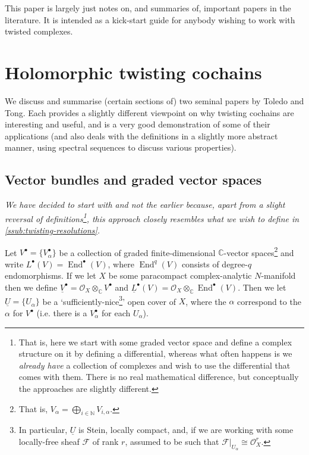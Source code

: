 \documentclass[11pt,notitlepage]{article}
\numberwithin{equation}{subsection}
\DeclareMathOperator{\End}{End}
\begin{document}
                This paper is largely just notes on, and summaries of, important papers in the literature.
                It is intended as a kick-start guide for anybody wishing to work with twisted complexes.

        \section{Holomorphic twisting cochains}\label{sec:holomorphic-twisting-cochains}

            We discuss and summarise (certain sections of) two seminal papers by Toledo and Tong.
            Each provides a slightly different viewpoint on why twisting cochains are interesting and useful, and \cite{OBrian:1981vs} is a very good demonstration of some of their applications (and also deals with the definitions in a slightly more abstract manner, using spectral sequences to discuss various properties).

            \subsection{Vector bundles and graded vector spaces}\label{ssub:vector-bundles-and-graded-vector-spaces}

                \emph{We have decided to start with \cite{Toledo:1978tq} and not the earlier \cite{Toledo:1976gy} because, apart from a slight reversal of definitions\footnote{That is, here we start with some graded vector space and define a complex structure on it by defining a differential, whereas what often happens is we \textit{already have} a collection of complexes and wish to use the differential that comes with them. There is no real mathematical difference, but conceptually the approaches are slightly different.}, this approach closely resembles what we wish to define in \cref{ssub:twisting-resolutions}.}

                \bigskip

                Let $V^\bullet=\{V^\bullet_\alpha\}$ be a collection of graded finite-dimensional $\mathbb{C}$-vector spaces\footnote{That is, $V_\alpha=\bigoplus_{i\in\mathbb{N}}V_{i,\alpha}$.} and write $L^\bullet(V)=\End^\bullet(V)$, where $\End^q(V)$ consists of degree-$q$ endomorphisms.
                If we let $X$ be some paracompact complex-analytic $N$-manifold then we define $\underline{V}^\bullet = \mathcal{O}_X\otimes_\mathbb{C}V^\bullet$ and $\underline{L}^\bullet(V) = \mathcal{O}_X\otimes_\mathbb{C}\End^\bullet(V)$.
                Then we let $\underline{U}=\{U_\alpha\}$ be a `sufficiently-nice\footnote{In particular, $\underline{U}$ is Stein, locally compact, and, if we are working with some locally-free sheaf $\mathcal{F}$ of rank $r$, assumed to be such that $\mathcal{F}|_{U_\alpha}\cong\mathcal{O}_X^r$.}' open cover of $X$, where the $\alpha$ correspond to the $\alpha$ for $V^\bullet$ (i.e. there is a $V^\bullet_\alpha$ for each $U_\alpha$).
\end{document}
